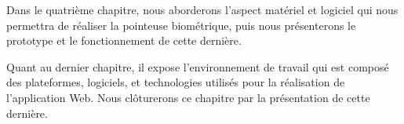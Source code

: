 Dans le quatrième chapitre, nous aborderons l’aspect matériel et logiciel qui
nous permettra de réaliser la pointeuse biométrique, puis nous présenterons le
prototype et le fonctionnement de cette dernière.
\clearpage

Quant au dernier chapitre, il expose l’environnement de travail qui est composé
des plateformes, logiciels, et technologies utilisés pour la réalisation de
l’application Web. Nous clôturerons ce chapitre par la présentation de
cette dernière.
